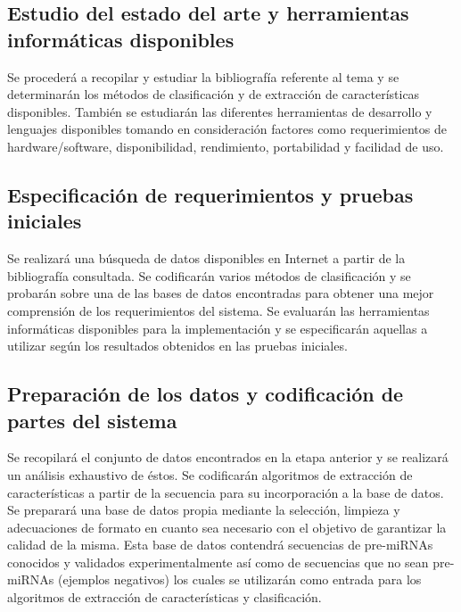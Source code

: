 \documentclass[12pt,bibliography=oldstyle,DIV=12,parskip=full-]{scrartcl}
\begin{document}
\subsection{Estudio del estado del arte y herramientas informáticas
  disponibles}
Se procederá a recopilar y estudiar la bibliografía referente al tema
y se determinarán los métodos de clasificación y de extracción de
características disponibles. También se estudiarán las diferentes
herramientas de desarrollo y lenguajes disponibles tomando en
consideración factores como requerimientos de hardware/software,
disponibilidad, rendimiento, portabilidad y facilidad de uso.
%

\subsection{Especificación de requerimientos y pruebas iniciales}
Se realizará una búsqueda de datos disponibles en Internet a partir de
la bibliografía consultada.  Se codificarán varios métodos de
clasificación y se probarán sobre una de las bases de datos
encontradas para obtener una mejor comprensión de los requerimientos
del sistema.
%
Se evaluarán las herramientas informáticas disponibles para la
implementación y se especificarán aquellas a utilizar según los
resultados obtenidos en las pruebas iniciales.
%
\subsection{Preparación de los datos y codificación de partes del sistema}
Se recopilará el conjunto de datos encontrados en la etapa anterior
y se realizará un análisis exhaustivo de éstos.
Se codificarán algoritmos de extracción de características a partir de
la secuencia para su incorporación a la base de datos.
Se preparará una base
de datos propia mediante la selección, limpieza y adecuaciones de
formato en cuanto sea necesario con el objetivo de garantizar la
calidad de la misma. Esta base de datos contendrá secuencias de
pre-miRNAs conocidos y validados experimentalmente así como de
secuencias que no sean pre-miRNAs (ejemplos negativos) los cuales se
utilizarán como entrada para los algoritmos de extracción de
características y clasificación.
\end{document}
